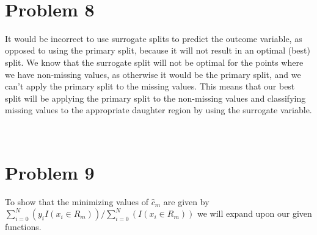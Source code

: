 \documentclass[11pt]{article}
\begin{document}
\newpage
\begin{center}
\ \\
\end{center}

\section*{Problem 8}

\vspace{5 mm}
\noindent
It would be incorrect to use surrogate splits to predict the outcome variable, 
as opposed to using the primary split, because it will not result in an optimal 
(best) split.  We know that the surrogate split will not be optimal for the 
points where we have non-missing values, as otherwise it would be the primary 
split, and we can't apply the primary split to the missing values.  This means 
that our best split will be applying the primary split to the non-missing 
values and classifying missing values to the appropriate daughter region by 
using the surrogate variable.

\newpage
\begin{center}
\ \\
\end{center}

\section*{Problem 9}

\vspace{5 mm}
\noindent
To show that the minimizing values of $\hat{c}_{m}$ are given by 
$\sum\limits_{i=0}^N (y_{i} I(x_{i} \in R_{m})) / 
\sum\limits_{i=0}^N (I(x_{i} \in R_{m}))$ 
we will expand upon our given functions.
\end{document}
